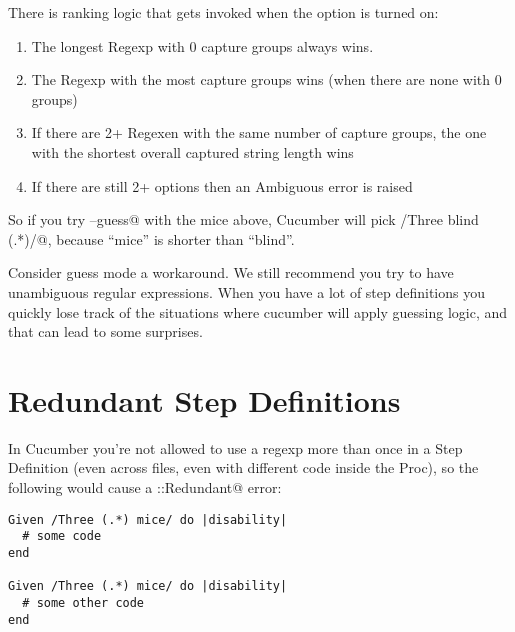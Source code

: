 There is ranking logic that gets invoked when the option is turned on:

\begin{enumerate}
  \item The longest Regexp with 0 capture groups always wins.
  \item The Regexp with the most capture groups wins (when there are none with 0 groups)
  \item If there are 2+ Regexen with the same number of capture groups, the one with the shortest overall captured string length wins
  \item If there are still 2+ options then an Ambiguous error is raised
\end{enumerate}

So if you try \verb@--guess@ with the mice above, Cucumber will pick \verb@/Three blind (.*)/@, because ``mice'' is shorter than ``blind''.

Consider guess mode a workaround. We still recommend you try to have unambiguous regular expressions. When you have a lot of step definitions you quickly lose track of the situations where cucumber will apply guessing logic, and that can lead to some surprises.

\section{Redundant Step Definitions}

In Cucumber you're not allowed to use a regexp more than once in a Step Definition (even across files, even with different code inside the Proc), so the following would cause a \verb@Cucumber::Redundant@ error:

\begin{verbatim}
Given /Three (.*) mice/ do |disability|
  # some code
end

Given /Three (.*) mice/ do |disability|
  # some other code
end

\end{verbatim}
